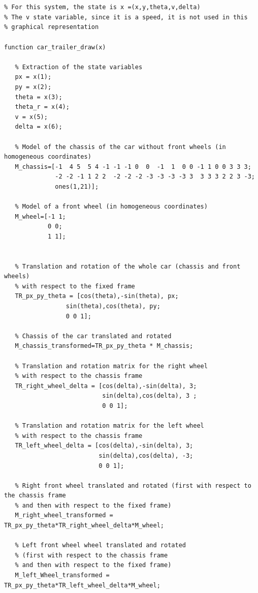 \documentclass{article}
\begin{document}
\begin{tcolorbox}
[
title={File \texttt{car\_trailer\_draw.m}}
]
\begin{scriptsize}
\begin{verbatim}


% For this system, the state is x =(x,y,theta,v,delta)
% The v state variable, since it is a speed, it is not used in this 
% graphical representation

function car_trailer_draw(x)

   % Extraction of the state variables
   px = x(1);
   py = x(2);
   theta = x(3);
   theta_r = x(4);
   v = x(5);
   delta = x(6);
  
   % Model of the chassis of the car without front wheels (in homogeneous coordinates)
   M_chassis=[-1  4 5  5 4 -1 -1 -1 0  0  -1  1  0 0 -1 1 0 0 3 3 3; 
              -2 -2 -1 1 2 2  -2 -2 -2 -3 -3 -3 -3 3  3 3 3 2 2 3 -3;
              ones(1,21)];
  
   % Model of a front wheel (in homogeneous coordinates)
   M_wheel=[-1 1;
            0 0;
            1 1]; 
   
   
   % Translation and rotation of the whole car (chassis and front wheels) 
   % with respect to the fixed frame
   TR_px_py_theta = [cos(theta),-sin(theta), px;
                 sin(theta),cos(theta), py;
                 0 0 1]; 
   
   % Chassis of the car translated and rotated
   M_chassis_transformed=TR_px_py_theta * M_chassis;   
   
   % Translation and rotation matrix for the right wheel 
   % with respect to the chassis frame 
   TR_right_wheel_delta = [cos(delta),-sin(delta), 3;
                           sin(delta),cos(delta), 3 ;
                           0 0 1]; 
   
   % Translation and rotation matrix for the left wheel 
   % with respect to the chassis frame
   TR_left_wheel_delta = [cos(delta),-sin(delta), 3;
                          sin(delta),cos(delta), -3;
                          0 0 1]; 
   
   % Right front wheel translated and rotated (first with respect to the chassis frame 
   % and then with respect to the fixed frame)
   M_right_wheel_transformed = TR_px_py_theta*TR_right_wheel_delta*M_wheel; 
   
   % Left front wheel wheel translated and rotated 
   % (first with respect to the chassis frame 
   % and then with respect to the fixed frame)
   M_left_Wheel_transformed = TR_px_py_theta*TR_left_wheel_delta*M_wheel; 

\end{verbatim}
\end{scriptsize}
\end{tcolorbox}
\end{document}
